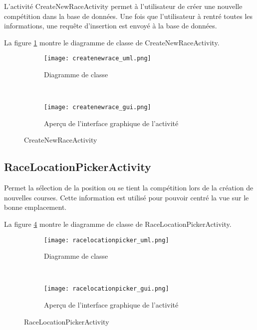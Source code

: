 L'activité CreateNewRaceActivity permet à l'utilisateur de créer une nouvelle compétition dans la base de données. Une fois que l'utilisateur à rentré toutes les informations, une requête d'insertion est envoyé à la base de données.

La figure \ref{fig:createnewrace_uml} montre le diagramme de classe de CreateNewRaceActivity.

\begin{figure}[htb!]
    \centering
    \begin{subfigure}[htb]{0.49\textwidth}
		\texttt{[image: createnewrace\_uml.png]} 
		\caption{Diagramme de classe}
		\label{fig:createnewrace_uml}
    \end{subfigure}
    ~ %
    \begin{subfigure}[htb]{0.49\textwidth}
		\texttt{[image: createnewrace\_gui.png]} 
		\caption{Aperçu de l'interface graphique de l'activité}
		\label{fig:createnewrace_gui}
    \end{subfigure}
    \caption{CreateNewRaceActivity}\label{fig:createnewrace_fig}
\end{figure}

\subsection{RaceLocationPickerActivity}

Permet la sélection de la position ou se tient la compétition lors de la création de nouvelles courses. Cette information est utilisé pour pouvoir centré la vue sur le bonne emplacement.

La figure \ref{fig:racelocationpicker_uml} montre le diagramme de classe de RaceLocationPickerActivity.

\begin{figure}[htb!]
    \centering
    \begin{subfigure}[htb]{0.49\textwidth}
		\texttt{[image: racelocationpicker\_uml.png]} 
		\caption{Diagramme de classe}
		\label{fig:racelocationpicker_uml}
    \end{subfigure}
    ~ %
    \begin{subfigure}[htb]{0.49\textwidth}
		\texttt{[image: racelocationpicker\_gui.png]} 
		\caption{Aperçu de l'interface graphique de l'activité}
		\label{fig:racelocationpicker_gui}
    \end{subfigure}
    \caption{RaceLocationPickerActivity}\label{fig:racelocationpicker_fig}
\end{figure}

